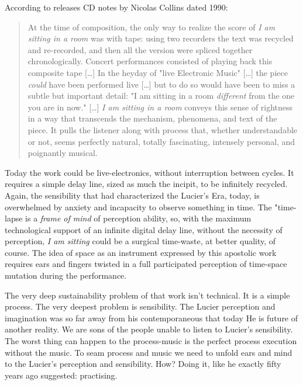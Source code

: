 \documentclass[twoside,a4paper]{article}
\begin{document}
According to releases CD notes by Nicolas Collins dated 1990:

\begin{quote}
At the time of composition, the only way to realize the score of \emph{I am sitting in a room} was with tape: using two recorders the text was recycled and re-recorded, and then all the version were spliced together chronologically. Concert performances consisted of playing back this composite tape [\ldots] In the heyday of "live Electronic Music" [\ldots] the piece \emph{could} have been performed live [\ldots] but to do so would have been to miss a subtle but important detail: "I am sitting in a room \emph{different} from the one you are in now." [\ldots] \emph{I am sitting in a room} conveys this sense of rightness in a way that transcends the mechanism, phenomena, and text of the piece. It pulls the listener along with process that, whether understandable or not, seems perfectly natural, totally fascinating, intensely personal, and poignantly musical. 
\end{quote}

Today the work could be live-electronics, without interruption between cycles. It requires a simple delay line, sized as much the incipit, to be infinitely recycled. Again, the sensibility that had characterized the Lucier's Era, today, is overwhelmed by anxiety and incapacity to observe something in time. The "time-lapse is a \emph{frame of mind} of perception ability, so, with the maximum technological support of an infinite digital delay line, without the necessity of perception, \emph{I am sitting} could be a surgical time-waste, at better quality, of course. The idea of space as an instrument expressed by this apostolic work requires ears and fingers twisted in a full participated perception of time-space mutation during the performance. 


The very deep sustainability problem of that work isn't technical. It is a simple process. The very deepest problem is sensibility. The Lucier perception and imagination was so far away from his contemporaneous that today He is future of another reality. We are sons of the people unable to listen to Lucier's sensibility. The worst thing can happen to the process-music is the perfect process execution without the music. To seam process and music we need to unfold ears and mind to the Lucier's perception and sensibility. How? Doing it, like he exactly fifty years ago suggested: practising. 
\end{document}
